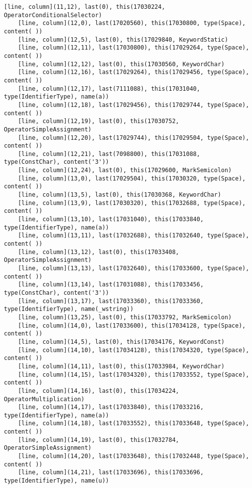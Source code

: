 \documentclass[UTF8]{ctexart}
\begin{document}
{\begin{lstlisting}[language={[ANSI]C++}]
    [line, column](11,12), last(0), this(17030224, OperatorConditionalSelector)
    [line, column](12,0), last(17020560), this(17030800, type(Space), content( ))
    [line, column](12,5), last(0), this(17029840, KeywordStatic)
    [line, column](12,11), last(17030800), this(17029264, type(Space), content( ))
    [line, column](12,12), last(0), this(17030560, KeywordChar)
    [line, column](12,16), last(17029264), this(17029456, type(Space), content( ))
    [line, column](12,17), last(7111088), this(17031040, type(IdentifierType), name(a))
    [line, column](12,18), last(17029456), this(17029744, type(Space), content( ))
    [line, column](12,19), last(0), this(17030752, OperatorSimpleAssignment)
    [line, column](12,20), last(17029744), this(17029504, type(Space), content( ))
    [line, column](12,21), last(7098800), this(17031088, type(ConstChar), content('3'))
    [line, column](12,24), last(0), this(17029600, MarkSemicolon)
    [line, column](13,0), last(17029504), this(17030320, type(Space), content( ))
    [line, column](13,5), last(0), this(17030368, KeywordChar)
    [line, column](13,9), last(17030320), this(17032688, type(Space), content( ))
    [line, column](13,10), last(17031040), this(17033840, type(IdentifierType), name(a))
    [line, column](13,11), last(17032688), this(17032640, type(Space), content( ))
    [line, column](13,12), last(0), this(17033408, OperatorSimpleAssignment)
    [line, column](13,13), last(17032640), this(17033600, type(Space), content( ))
    [line, column](13,14), last(17031088), this(17033456, type(ConstChar), content('3'))
    [line, column](13,17), last(17033360), this(17033360, type(IdentifierType), name(_wstring))
    [line, column](13,25), last(0), this(17033792, MarkSemicolon)
    [line, column](14,0), last(17033600), this(17034128, type(Space), content( ))
    [line, column](14,5), last(0), this(17034176, KeywordConst)
    [line, column](14,10), last(17034128), this(17034320, type(Space), content( ))
    [line, column](14,11), last(0), this(17033984, KeywordChar)
    [line, column](14,15), last(17034320), this(17033552, type(Space), content( ))
    [line, column](14,16), last(0), this(17034224, OperatorMultiplication)
    [line, column](14,17), last(17033840), this(17033216, type(IdentifierType), name(a))
    [line, column](14,18), last(17033552), this(17033648, type(Space), content( ))
    [line, column](14,19), last(0), this(17032784, OperatorSimpleAssignment)
    [line, column](14,20), last(17033648), this(17032448, type(Space), content( ))
    [line, column](14,21), last(17033696), this(17033696, type(IdentifierType), name(u))

\end{lstlisting}}
\end{document}
